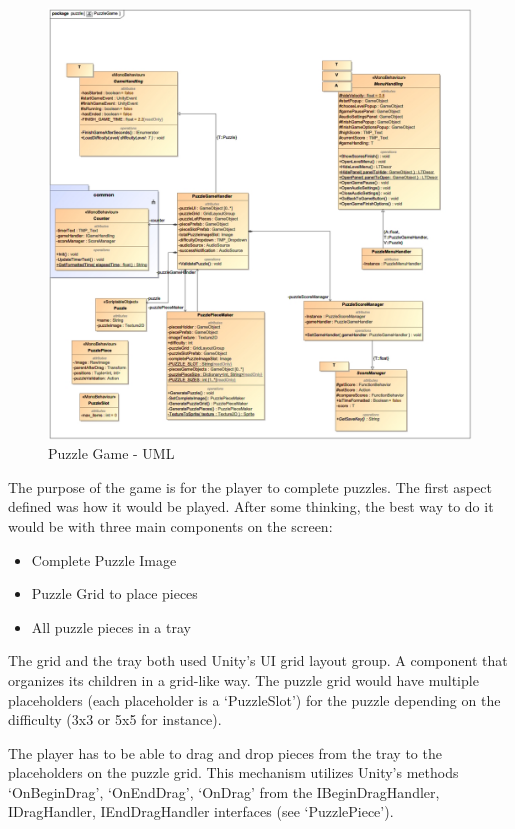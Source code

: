 \begin{figure}[!h]
    \centering
    \includegraphics[scale=0.25]{Chapters/arq/PuzzleGame.jpg}
    \caption{Puzzle Game - UML}
    \label{fig:puzzleGameArq}
\end{figure}

The purpose of the game is for the player to complete puzzles. The first aspect defined was how it would be played. After some thinking, the best way to do it would be with three main components on the screen:

\begin{itemize}
    \item Complete Puzzle Image
    \item Puzzle Grid to place pieces
    \item All puzzle pieces in a tray
\end{itemize}

The grid and the tray both used Unity's UI grid layout group. A component that organizes its children in a grid-like way. The puzzle grid would have multiple placeholders (each placeholder is a `PuzzleSlot') for the puzzle depending on the difficulty (3x3 or 5x5 for instance).

The player has to be able to drag and drop pieces from the tray to the placeholders on the puzzle grid. This mechanism utilizes Unity's methods `OnBeginDrag', `OnEndDrag', `OnDrag' from the IBeginDragHandler, IDragHandler, IEndDragHandler interfaces (see `PuzzlePiece').

